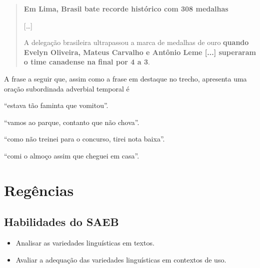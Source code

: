 \begin{quote}
\textbf{Em Lima, Brasil bate recorde histórico com 308 medalhas}


{[}\ldots{}{]}

A delegação brasileira ultrapassou a marca de medalhas de ouro
\textbf{quando Evelyn Oliveira, Mateus Carvalho e Antônio Leme {[}...{]}
superaram o time canadense na final por 4 a 3}.

\end{quote}

A frase a seguir que, assim como a frase em destaque no trecho,
apresenta uma oração subordinada adverbial temporal é

\begin{escolha}
\item ``estava tão faminta que vomitou''.

\item ``vamos ao parque, contanto que não chova''.

\item ``como não treinei para o concurso, tirei nota baixa''.

\item ``comi o almoço assim que cheguei em casa''.
\end{escolha}

\chapter{Regências}

\section{Habilidades do SAEB}

\begin{itemize}
\item Analisar as variedades linguísticas em textos.

\item Avaliar a adequação das variedades linguísticas em contextos de uso.
\end{itemize}


